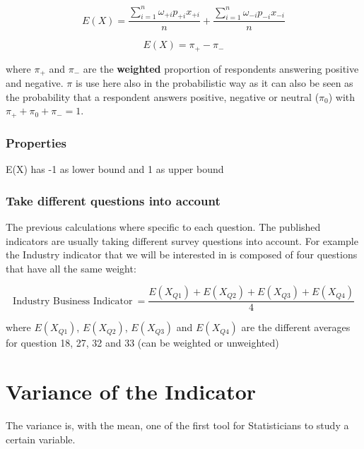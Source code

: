 \documentclass[12pt,a4paper,oneside]{book}
\begin{document}
\begin{equation}
    E(X) = \frac{ \sum_{i=1}^n \omega_{+i} p_{+i} x_{+i}}{n} + \frac{\sum_{i=1}^n \omega_{-i} p_{-i} x_{-i}}{n}
\end{equation} 


\begin{equation}
    E(X) = \pi_+ - \pi_-
\end{equation}

where $\pi_+$ and $\pi_-$ are the \textbf{weighted} proportion of respondents answering positive and negative. $\pi$ is use here also in the probabilistic way as it can also be seen as the probability that a respondent answers positive, negative or neutral ($\pi_0$) with $\pi_+ + \pi_0 + \pi_- =1$.




\subsection{Properties}

E(X) has -1 as lower bound and 1 as upper bound






\subsection{Take different questions into account}

The previous calculations where specific to each question. The published indicators are usually taking different survey questions into account. For example the Industry indicator that we will be interested in is composed of four questions that have all the same weight:

\begin{equation}
    \mbox{Industry Business Indicator}\ = \frac{E(X_{Q1}) + E(X_{Q2}) + E(X_{Q3}) + E(X_{Q4})}{4}
\end{equation}

where 
$E(X_{Q1})$, $E(X_{Q2})$, $E(X_{Q3})$ and $E(X_{Q4})$ are the different averages for question 18, 27, 32 and 33 (can be weighted or unweighted)


\chapter{Variance of the Indicator}

The variance is, with the mean, one of the first tool for Statisticians to study a certain variable.
\end{document}

